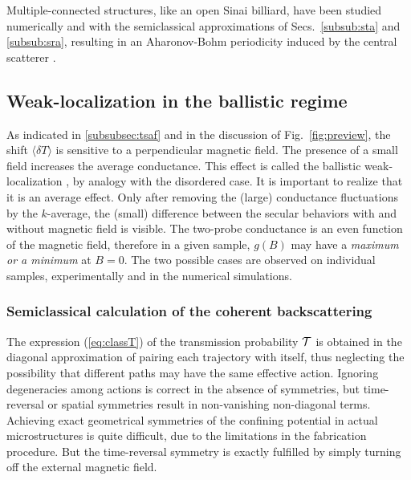 \documentclass[a4paper,10pt]{article}
\newcommand{\nin}{\noindent}
\newcommand{\dlT}{\delta T}
\begin{document}
\nin Multiple-connected structures, like an open Sinai billiard, have been studied numerically and with the semiclassical approximations of Secs.~\ref{subsub:sta} and \ref{subsub:sra}, resulting in an Aharonov-Bohm periodicity induced by the central scatterer \cite{Kawabata97}. 

\subsection{Weak-localization in the ballistic regime}
\label{subsec:wl}

As indicated in \ref{subsubsec:tsaf} and in the discussion of  Fig.~\ref{fig:preview}, the shift $\langle \dlT \rangle$  is sensitive
to a perpendicular magnetic field. The presence of a small field increases
the average conductance. This effect is called the ballistic weak-localization \cite{Bar93}, by analogy with the disordered case.
It is important to realize that it is an average effect. Only after removing the (large) conductance fluctuations by the $k$-average, the (small) difference between the secular behaviors with and without magnetic field is visible. The two-probe conductance is an even function of the magnetic field, therefore in a given sample, $g(B)$ may have a {\em maximum or a minimum} at $B\!=\!0$. The two possible cases are observed on individual samples, experimentally \cite{Kel94} and in the numerical simulations. 

\subsubsection{Semiclassical calculation of the coherent backscattering}
\label{subsubsec:sccb}

The expression (\ref{eq:classT}) of the transmission probability ${\cal T}$ is obtained in the diagonal approximation of pairing each trajectory with itself, thus neglecting the possibility that different paths may have the same effective action. Ignoring degeneracies among actions is correct in the absence of symmetries, but time-reversal or spatial symmetries result in non-vanishing non-diagonal terms. Achieving exact geometrical symmetries of the confining potential in actual microstructures is quite difficult, due to the limitations in the fabrication procedure. But the time-reversal symmetry is exactly fulfilled by simply turning off the external magnetic field.
\end{document}
